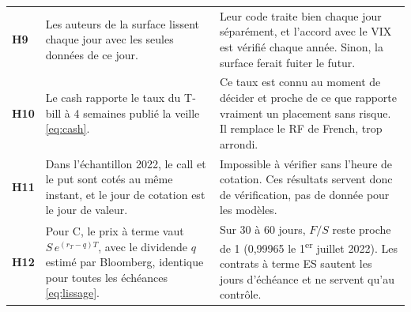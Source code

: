 \documentclass[10pt,a4paper]{article}
\begin{document}
{\begin{longtable}{@{}>{\leavevmode\bfseries\color{sarcelle}}p{0.65cm} L{7.4cm} L{9.1cm}@{}}
H9 & Les auteurs de la surface lissent chaque jour avec les seules données de ce jour. & Leur code traite bien chaque jour séparément, et l'accord avec le VIX est vérifié chaque année. Sinon, la surface ferait fuiter le futur. \\
H10 & Le cash rapporte le taux du T-bill à 4 semaines publié la veille \eqref{eq:cash}. & Ce taux est connu au moment de décider et proche de ce que rapporte vraiment un placement sans risque. Il remplace le RF de French, trop arrondi. \\
H11 & Dans l'échantillon 2022, le call et le put sont cotés au même instant, et le jour de cotation est le jour de valeur. & Impossible à vérifier sans l'heure de cotation. Ces résultats servent donc de vérification, pas de donnée pour les modèles. \\
H12 & Pour C, le prix à terme vaut $S\,e^{(r_T-q)T}$, avec le dividende $q$ estimé par Bloomberg, identique pour toutes les échéances \eqref{eq:lissage}. & Sur 30 à 60 jours, $F/S$ reste proche de 1 (0,99965 le 1\textsuperscript{er} juillet 2022). Les contrats à terme ES sautent les jours d'échéance et ne servent qu'au contrôle. \\
\end{longtable}}

\end{document}
